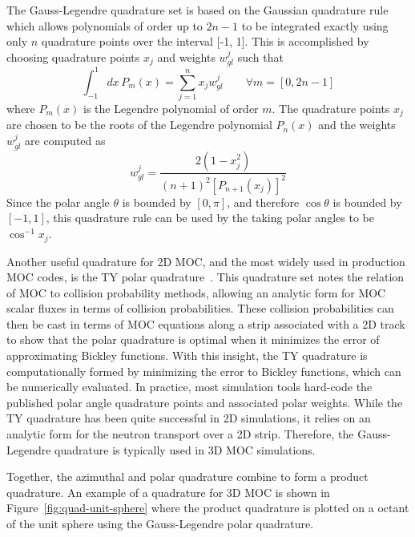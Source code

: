 The Gauss-Legendre quadrature set is based on the Gaussian quadrature rule which allows polynomials of order up to $2n-1$ to be integrated exactly using only $n$ quadrature points over the interval [-1, 1]. This is accomplished by choosing quadrature points $x_j$ and weights $w_{\textit{gl}}^j$ such that
\begin{equation}
\int_{-1}^{1} dx \, P_m(x) = \sum_{j=1}^n x_j w_{\textit{gl}}^j \qquad \forall m = [0, 2n-1]
\end{equation}
where $P_m(x)$ is the Legendre polynomial of order $m$. The quadrature points $x_j$ are chosen to be the roots of the Legendre polynomial $P_n(x)$ and the weights $w_{\textit{gl}}^j$ are computed as
\begin{equation}
w_{\textit{gl}}^j = \frac{2(1-x_j^2)}{(n+1)^2\left[P_{n+1}(x_j)\right]^2}
\end{equation}
Since the polar angle $\theta$ is bounded by $[0, \pi]$, and therefore $\cos\theta$ is bounded by $[-1, 1]$, this quadrature rule can be used by the taking polar angles to be $\cos^{-1} x_j$.  

Another useful quadrature for 2D \ac{MOC}, and the most widely used in production \ac{MOC} codes, is the TY polar quadrature~\cite{ty-quadrature}. This quadrature set notes the relation of \ac{MOC} to collision probability methods, allowing an analytic form for \ac{MOC} scalar fluxes in terms of collision probabilities. These collision probabilities can then be cast in terms of \ac{MOC} equations along a strip associated with a 2D track to show that the polar quadrature is optimal when it minimizes the error of approximating Bickley functions. With this insight, the TY quadrature is computationally formed by minimizing the error to Bickley functions, which can be numerically evaluated. In practice, most simulation tools hard-code the published polar angle quadrature points and associated polar weights. While the TY quadrature has been quite successful in 2D simulations, it relies on an analytic form for the neutron transport over a 2D strip. Therefore, the Gauss-Legendre quadrature is typically used in 3D \ac{MOC} simulations. 

Together, the azimuthal and polar quadrature combine to form a product quadrature. An example of a quadrature for 3D MOC is shown in Figure~\ref{fig:quad-unit-sphere} where the product quadrature is plotted on a octant of the unit sphere using the Gauss-Legendre polar quadrature.

